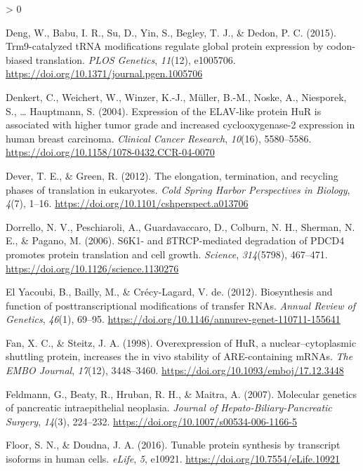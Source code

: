 \documentclass[
  12pt,
  openany]{book}
\newlength{\cslhangindent}
\newenvironment{CSLReferences}[2] %
 {%
  \setlength{\parindent}{0pt}
  \ifodd #1 \everypar{\setlength{\hangindent}{\cslhangindent}}\ignorespaces\fi
  \ifnum #2 > 0
  \setlength{\parskip}{#2\baselineskip}
  \fi
 }%
 {}
\begin{document}
\begin{CSLReferences}{1}{0}
\leavevmode\hypertarget{ref-Deng2015}{}%
Deng, W., Babu, I. R., Su, D., Yin, S., Begley, T. J., \& Dedon, P. C. (2015). Trm9-catalyzed {tRNA} modifications regulate global protein expression by codon-biased translation. \emph{{PLOS} Genetics}, \emph{11}(12), e1005706. \url{https://doi.org/10.1371/journal.pgen.1005706}

\leavevmode\hypertarget{ref-Denkert2004}{}%
Denkert, C., Weichert, W., Winzer, K.-J., Müller, B.-M., Noske, A., Niesporek, S., \ldots{} Hauptmann, S. (2004). Expression of the {ELAV}-like protein {HuR} is associated with higher tumor grade and increased cyclooxygenase-2 expression in human breast carcinoma. \emph{Clinical Cancer Research}, \emph{10}(16), 5580--5586. \url{https://doi.org/10.1158/1078-0432.CCR-04-0070}

\leavevmode\hypertarget{ref-Dever2012}{}%
Dever, T. E., \& Green, R. (2012). The elongation, termination, and recycling phases of translation in eukaryotes. \emph{Cold Spring Harbor Perspectives in Biology}, \emph{4}(7), 1--16. \url{https://doi.org/10.1101/cshperspect.a013706}

\leavevmode\hypertarget{ref-Dorrello2006}{}%
Dorrello, N. V., Peschiaroli, A., Guardavaccaro, D., Colburn, N. H., Sherman, N. E., \& Pagano, M. (2006). S6K1- and ß{TRCP}-mediated degradation of {PDCD}4 promotes protein translation and cell growth. \emph{Science}, \emph{314}(5798), 467--471. \url{https://doi.org/10.1126/science.1130276}

\leavevmode\hypertarget{ref-ElYacoubi2012}{}%
El Yacoubi, B., Bailly, M., \& Crécy-Lagard, V. de. (2012). Biosynthesis and function of posttranscriptional modifications of transfer {RNAs}. \emph{Annual Review of Genetics}, \emph{46}(1), 69--95. \url{https://doi.org/10.1146/annurev-genet-110711-155641}

\leavevmode\hypertarget{ref-Fan1998}{}%
Fan, X. C., \& Steitz, J. A. (1998). Overexpression of {HuR}, a nuclear--cytoplasmic shuttling protein, increases the in vivo stability of {ARE}-containing {mRNAs}. \emph{The {EMBO} Journal}, \emph{17}(12), 3448--3460. \url{https://doi.org/10.1093/emboj/17.12.3448}

\leavevmode\hypertarget{ref-Feldmann2007}{}%
Feldmann, G., Beaty, R., Hruban, R. H., \& Maitra, A. (2007). Molecular genetics of pancreatic intraepithelial neoplasia. \emph{Journal of Hepato-Biliary-Pancreatic Surgery}, \emph{14}(3), 224--232. \url{https://doi.org/10.1007/s00534-006-1166-5}

\leavevmode\hypertarget{ref-Floor2016}{}%
Floor, S. N., \& Doudna, J. A. (2016). Tunable protein synthesis by transcript isoforms in human cells. \emph{{eLife}}, \emph{5}, e10921. \url{https://doi.org/10.7554/eLife.10921}


\end{CSLReferences}
\end{document}
